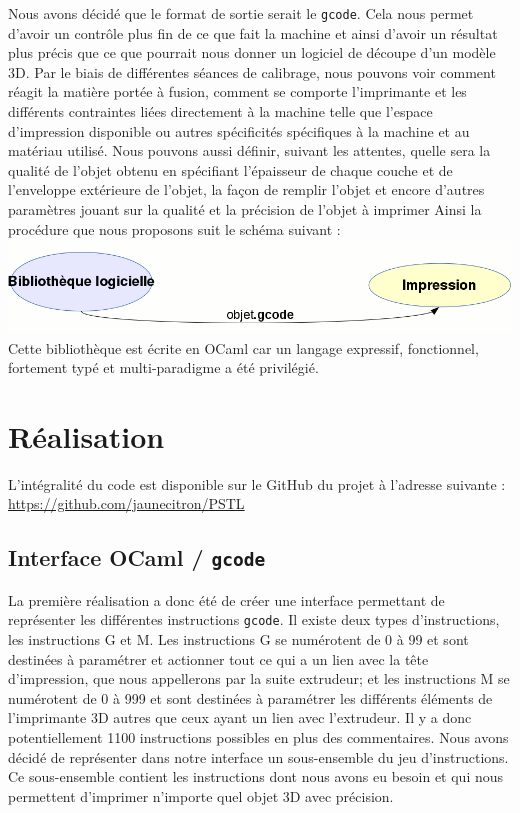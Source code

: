\documentclass[11pt, titlepage]{article}
\begin{document}
Nous avons décidé que le format de sortie serait le \verb&gcode&. Cela nous permet d'avoir un contrôle plus fin de ce que fait la machine et ainsi d'avoir un résultat plus précis que ce que pourrait nous donner un logiciel de découpe d'un modèle 3D.
Par le biais de différentes séances de calibrage, nous pouvons voir comment réagit la matière portée à fusion, comment se comporte l'imprimante et les différents contraintes liées directement à la machine telle que l'espace d'impression disponible ou autres spécificités spécifiques à la machine et au matériau utilisé.
Nous pouvons aussi définir, suivant les attentes, quelle sera la qualité de l'objet obtenu en spécifiant l'épaisseur de chaque couche et de l'enveloppe extérieure de l'objet, la façon de remplir l'objet et encore d'autres paramètres jouant sur la qualité et la précision de l'objet à imprimer
Ainsi la procédure que nous proposons suit le schéma suivant :
\includegraphics[scale=1]{img/Motivation.gif} 
Cette bibliothèque est écrite en OCaml car un langage expressif, fonctionnel, fortement typé et multi-paradigme a été privilégié.

\newpage
\section{Réalisation}
L'intégralité du code est disponible sur le GitHub du projet à l'adresse suivante :
\url{https://github.com/jaunecitron/PSTL}

\subsection{Interface OCaml / \verb&gcode&}
La première réalisation a donc été de créer une interface permettant de représenter les différentes instructions \verb&gcode&. Il existe deux types d'instructions, les instructions G et M. Les instructions G se numérotent de 0 à 99 et sont destinées à paramétrer et actionner tout ce qui a un lien avec la tête d'impression, que nous appellerons par la suite extrudeur; et les instructions M se numérotent de 0 à 999 et sont destinées à paramétrer les différents éléments de l'imprimante 3D autres que ceux ayant un lien avec l'extrudeur. Il y a donc potentiellement 1100 instructions possibles en plus des commentaires.
Nous avons décidé de représenter dans notre interface un sous-ensemble du jeu d'instructions. Ce sous-ensemble contient les instructions dont nous avons eu besoin et qui nous permettent d'imprimer n'importe quel objet 3D avec précision.
\newline
\end{document}
